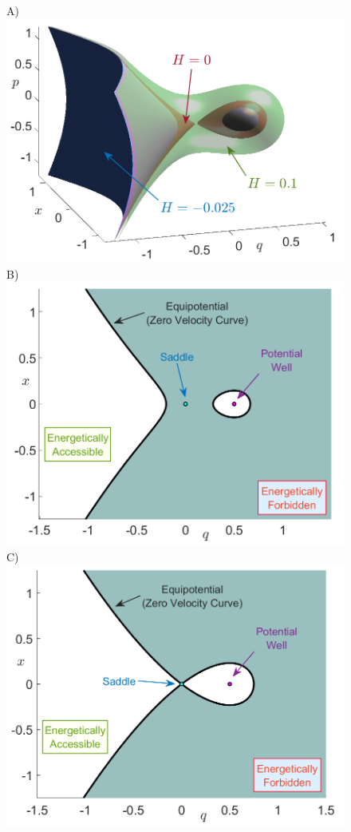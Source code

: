 \documentclass[8pt]{article}
\begin{document}
\begin{figure}[!ht]
	\begin{center}		
		A)\includegraphics[scale=0.26]{fig7a}
		B)\includegraphics[scale=0.26]{fig7b}
		C)\includegraphics[scale=0.26]{fig7c}

\end{center}
\end{figure}
\end{document}
